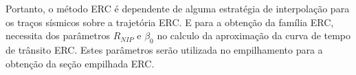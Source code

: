 Portanto, o método ERC é dependente de alguma estratégia de interpolação para os traços sísmicos sobre a trajetória ERC.
E para a obtenção da família ERC, necessita dos parâmetros $R_{NIP}$ e $\beta_0$ no calculo da aproximação da curva de tempo
de trânsito ERC. Estes parâmetros serão utilizada no empilhamento para a obtenção da seção empilhada ERC.
